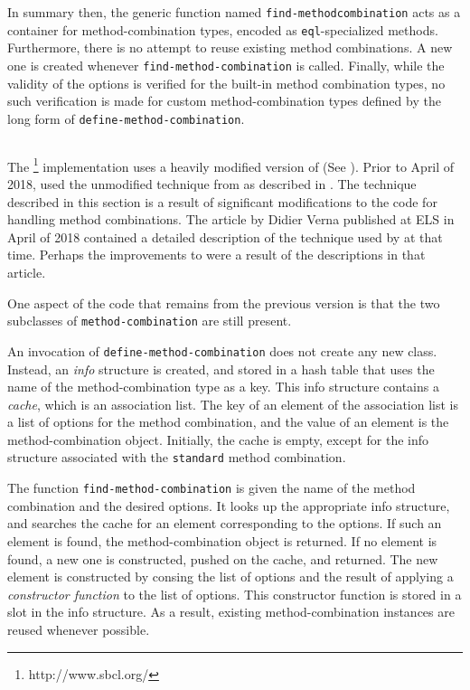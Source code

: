 In summary then, the generic function named \texttt{find-method\-combination}
acts as a container for method-combination types, encoded as
\texttt{eql}-specialized methods.  Furthermore, there is no attempt to
reuse existing method combinations.  A new one is created whenever
\texttt{find-method-combination} is called.  Finally, while the
validity of the options is verified for the built-in method
combination types, no such verification is made for custom
method-combination types defined by the long form of
\texttt{define-method-combination}.

\subsection{\sbcl{}}

The \sbcl{}%
\footnote{http://www.sbcl.org/}
\commonlisp{} implementation uses a heavily modified
version of \pcl{} (See ).  Prior to April of 2018,
\sbcl{} used the unmodified technique from \pcl{} as described in
.  The technique described in this section is a result
of significant modifications to the code for handling method
combinations.  The article by Didier Verna \cite{verna.18.els}
published at ELS in April of 2018 contained a detailed description of
the technique used by \sbcl{} at that time.  Perhaps the improvements
to \sbcl{} were a result of the descriptions in that article.

One aspect of the \sbcl{} code that remains from the previous version
is that the two subclasses of \texttt{method-combination} are still
present.

An invocation of \texttt{define-method-combination} does not create
any new class.  Instead, an \emph{info} structure is created, and
stored in a hash table that uses the name of the method-combination
type as a key.  This info structure contains a \emph{cache}, which is
an association list.  The key of an element of the association list is
a list of options for the method combination, and the value of an
element is the method-combination object.  Initially, the cache is
empty, except for the info structure associated with the
\texttt{standard} method combination.

The function \texttt{find-method-combination} is given the name of the
method combination and the desired options.  It looks up the
appropriate info structure, and searches the cache for an element
corresponding to the options.  If such an element is found, the
method-combination object is returned.  If no element is found, a new
one is constructed, pushed on the cache, and returned.  The new
element is constructed by consing the list of options and the result
of applying a \emph{constructor function} to the list of options.
This constructor function is stored in a slot in the info structure.
As a result, existing method-combination instances are reused whenever
possible.

